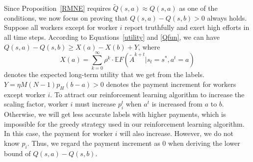 Since Proposition~\ref{RMNE} requires $\tilde{Q}(s,a)\approx Q(s,a)$ as one of the conditions, we now focus on proving that $Q(s,a)- Q(s,b) >0$ always holds.
Suppose all workers except for worker $i$ report truthfully and exert high efforts in all time steps.
According to Equations~\ref{utility} and \ref{Qfun}, we can have $Q(s,a)- Q(s,b) \geq  X(a)-X(b) + Y$, where 
\begin{equation}
X(a)={\sum}_{k=0}^{\infty}\rho^{k}\cdot \mathbb{E}F(\tilde{A}^{k+t}|s_t= s^{*}, a^t=a)
\end{equation}
denotes the expected long-term utility that we get from the labels.
$Y= \eta M(N-1)p_H (b-a)>0$ denotes the payment increment for workers except worker $i$.
To attract our reinforcement learning algorithm to increase the scaling factor, worker $i$ must increase $p_i^t$ when $a^t$ is increased from $a$ to $b$.
Otherwise, we will get less accurate labels with higher payments, which is impossible for the greedy strategy used in our reinforcement learning algorithm.
In this case, the payment for worker $i$ will also increase.
However, we do not know $p_i$. Thus, we regard the payment increment as $0$ when deriving the lower bound of $Q(s,a)- Q(s,b)$.

%
%
%

